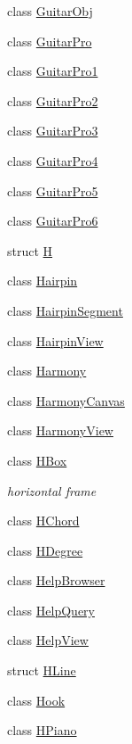 \begin{DoxyCompactItemize}
class \hyperlink{class_ms_1_1_guitar_obj}{Guitar\+Obj}
\item 
class \hyperlink{class_ms_1_1_guitar_pro}{Guitar\+Pro}
\item 
class \hyperlink{class_ms_1_1_guitar_pro1}{Guitar\+Pro1}
\item 
class \hyperlink{class_ms_1_1_guitar_pro2}{Guitar\+Pro2}
\item 
class \hyperlink{class_ms_1_1_guitar_pro3}{Guitar\+Pro3}
\item 
class \hyperlink{class_ms_1_1_guitar_pro4}{Guitar\+Pro4}
\item 
class \hyperlink{class_ms_1_1_guitar_pro5}{Guitar\+Pro5}
\item 
class \hyperlink{class_ms_1_1_guitar_pro6}{Guitar\+Pro6}
\item 
struct \hyperlink{struct_ms_1_1_h}{H}
\item 
class \hyperlink{class_ms_1_1_hairpin}{Hairpin}
\item 
class \hyperlink{class_ms_1_1_hairpin_segment}{Hairpin\+Segment}
\item 
class \hyperlink{class_ms_1_1_hairpin_view}{Hairpin\+View}
\item 
class \hyperlink{class_ms_1_1_harmony}{Harmony}
\item 
class \hyperlink{class_ms_1_1_harmony_canvas}{Harmony\+Canvas}
\item 
class \hyperlink{class_ms_1_1_harmony_view}{Harmony\+View}
\item 
class \hyperlink{class_ms_1_1_h_box}{H\+Box}
\begin{DoxyCompactList}\small\item\em horizontal frame \end{DoxyCompactList}\item 
class \hyperlink{class_ms_1_1_h_chord}{H\+Chord}
\item 
class \hyperlink{class_ms_1_1_h_degree}{H\+Degree}
\item 
class \hyperlink{class_ms_1_1_help_browser}{Help\+Browser}
\item 
class \hyperlink{class_ms_1_1_help_query}{Help\+Query}
\item 
class \hyperlink{class_ms_1_1_help_view}{Help\+View}
\item 
struct \hyperlink{struct_ms_1_1_h_line}{H\+Line}
\item 
class \hyperlink{class_ms_1_1_hook}{Hook}
\item 
class \hyperlink{class_ms_1_1_h_piano}{H\+Piano}
\item 

\end{DoxyCompactItemize}
